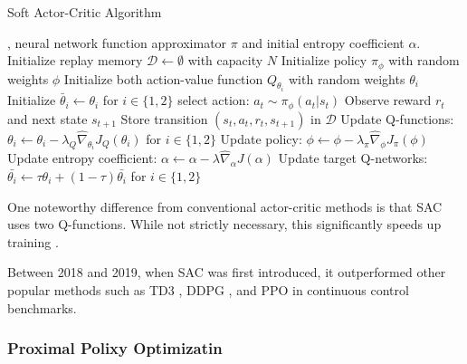 \begin{algorithm}[H]
\caption{Soft Actor-Critic Algorithm}
\begin{algorithmic}[1]
, neural network function approximator $\pi$ and initial entropy coefficient $\alpha$.
\State Initialize replay memory $\mathcal{D} \leftarrow \emptyset$ with capacity $N$
\State Initialize policy $\pi_{\phi}$ with random weights $\phi$
\State Initialize both action-value function $Q_{\theta_i}$ with random weights 
$\theta_i$
\State Initialize $\bar{\theta}_{i} \leftarrow \theta_{i}$ for $i \in \{1,2\}$
\Repeat
        \State select action: $a_{t} \sim \pi_{\phi}(a_{t} | s_{t})$
        \State Observe reward $r_{t}$ and next state $s_{t+1}$
        \State Store transition $(s_{t}, a_{t}, r_{t}, s_{t+1})$ in $\mathcal{D}$
    \EndFor
        \State Update Q-functions: $\theta_{i} \gets \theta_{i} - \lambda_{Q} \hat{\nabla}_{\theta_{i}} J_{Q}(\theta_{i})$ for $i \in \{1,2\}$
        \State Update policy: $\phi \gets \phi - \lambda_{\pi} \hat{\nabla}_{\phi} J_{\pi}(\phi)$
        \State Update entropy coefficient: $\alpha \gets \alpha - \lambda \hat{\nabla}_{\alpha} J(\alpha)$
        \State Update target Q-networks: $\bar{\theta_{i}} \gets \tau\theta_{i} + (1 - \tau) \bar{\theta_{i}}$ for $i \in \{1,2\}$
    \EndFor
{}


\end{algorithmic}
\end{algorithm}

One noteworthy difference from conventional actor-critic methods is that SAC uses two Q-functions. While not strictly necessary, this significantly speeds up training \cite{haarnojaSoftActorCriticAlgorithms2019}.

Between 2018 and 2019, when SAC was first introduced, it outperformed other popular methods such as TD3 \cite{fujimotoAddressingFunctionApproximation2018}, DDPG \cite{lillicrapContinuousControlDeep2019}, and PPO \cite{schulmanProximalPolicyOptimization2017} in continuous control benchmarks.

\subsubsection{Proximal Polixy Optimizatin}\label{subsec:PPO}

